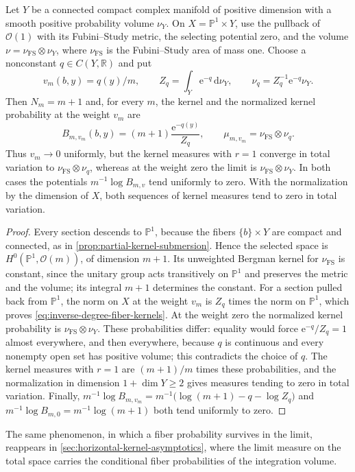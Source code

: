 \begin{example}\label{ex:inverse-degree-fiber-weight}
Let $Y$ be a connected compact complex manifold of positive dimension with a smooth positive probability volume $\nu_Y$. On $X=\mathbb P^1\times Y$, use the pullback of $\mathcal O(1)$ with its Fubini--Study metric, the selecting potential zero, and the volume $\nu=\nu_{\mathrm{FS}}\otimes\nu_Y$, where $\nu_{\mathrm{FS}}$ is the Fubini--Study area of mass one. Choose a nonconstant $q\in C(Y,\mathbb R)$ and put
\[
 v_m(b,y)=q(y)/m,\qquad
 Z_q=\int_Y\mathrm{e}^{-q}\,\mathrm{d}\nu_Y,\qquad
 \nu_q=Z_q^{-1}\mathrm{e}^{-q}\nu_Y.
\]
Then $N_m=m+1$ and, for every $m$, the kernel and the normalized kernel probability at the weight $v_m$ are
\begin{equation}\label{eq:inverse-degree-fiber-kernels}
 B_{m,v_m}(b,y)=(m+1)\frac{\mathrm{e}^{-q(y)}}{Z_q},
 \qquad
 \mu_{m,v_m}=\nu_{\mathrm{FS}}\otimes\nu_q.
\end{equation}
Thus $v_m\to0$ uniformly, but the kernel measures with $r=1$ converge in total variation to $\nu_{\mathrm{FS}}\otimes\nu_q$, whereas at the weight zero the limit is $\nu_{\mathrm{FS}}\otimes\nu_Y$. In both cases the potentials $m^{-1}\log B_{m,v}$ tend uniformly to zero. With the normalization by the dimension of $X$, both sequences of kernel measures tend to zero in total variation.
\end{example}
\begin{proof}
Every section descends to $\mathbb P^1$, because the fibers $\{b\}\times Y$ are compact and connected, as in \cref{prop:partial-kernel-submersion}. Hence the selected space is $H^0(\mathbb P^1,\mathcal O(m))$, of dimension $m+1$. Its unweighted Bergman kernel for $\nu_{\mathrm{FS}}$ is constant, since the unitary group acts transitively on $\mathbb P^1$ and preserves the metric and the volume; its integral $m+1$ determines the constant. For a section pulled back from $\mathbb P^1$, the norm on $X$ at the weight $v_m$ is $Z_q$ times the norm on $\mathbb P^1$, which proves \eqref{eq:inverse-degree-fiber-kernels}. At the weight zero the normalized kernel probability is $\nu_{\mathrm{FS}}\otimes\nu_Y$. These probabilities differ: equality would force $\mathrm{e}^{-q}/Z_q=1$ almost everywhere, and then everywhere, because $q$ is continuous and every nonempty open set has positive volume; this contradicts the choice of $q$. The kernel measures with $r=1$ are $(m+1)/m$ times these probabilities, and the normalization in dimension $1+\dim Y\geq2$ gives measures tending to zero in total variation. Finally, $m^{-1}\log B_{m,v_m}=m^{-1}\bigl(\log(m+1)-q-\log Z_q\bigr)$ and $m^{-1}\log B_{m,0}=m^{-1}\log(m+1)$ both tend uniformly to zero.
\end{proof}

The same phenomenon, in which a fiber probability survives in the limit, reappears in \cref{sec:horizontal-kernel-asymptotics}, where the limit measure on the total space carries the conditional fiber probabilities of the integration volume.
